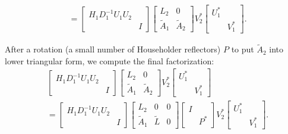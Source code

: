 \begin{align}
        \nonumber\\
    &= \begin{bmatrix}H_{1}D_{1}^{-1}U_{1}U_{2} & \\ & I \end{bmatrix}
        \begin{bmatrix} L_{2} & 0 \\
        \widetilde{A}_{1} & \widetilde{A}_{2} \end{bmatrix}
        V_{2}^{*}\begin{bmatrix} U_{1}^{*} & \\ & V_{1}^{*} \end{bmatrix}.
\end{align}

\noindent
After a rotation (a small number of Householder reflectors) $P$
to put $\widetilde{A}_{2}$ into lower triangular form,
we compute the final factorization:
%
\begin{align}
    &\begin{bmatrix}H_{1}D_{1}^{-1}U_{1}U_{2} & \\ & I \end{bmatrix}
        \begin{bmatrix} L_{2} & 0 \\
        \widetilde{A}_{1} & \widetilde{A}_{2} \end{bmatrix}
        V_{2}^{*}\begin{bmatrix} U_{1}^{*} & \\ & V_{1}^{*} \end{bmatrix}
            \nonumber\\
    &= \begin{bmatrix}H_{1}D_{1}^{-1}U_{1}U_{2} & \\ & I \end{bmatrix}
        \begin{bmatrix} L_{2} & 0 & 0 \\
        \widetilde{A}_{1} & \widetilde{L} & 0 \end{bmatrix}
        \begin{bmatrix} I & \\ & P^{*} \end{bmatrix} V_{2}^{*}
        \begin{bmatrix} U_{1}^{*} & \\ & V_{1}^{*} \end{bmatrix}.
\end{align}

